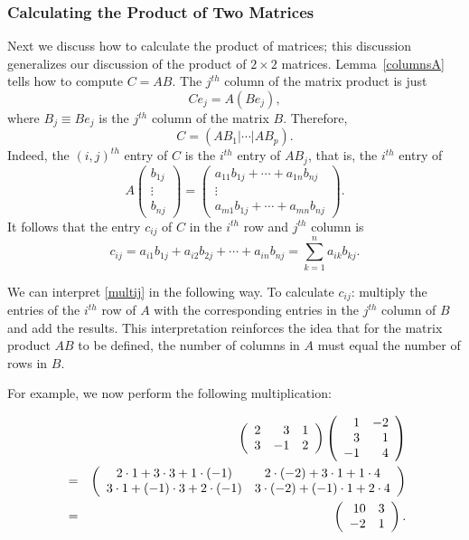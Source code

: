 \documentclass{ximera}
\begin{document}
\subsubsection*{Calculating the Product of Two Matrices}

Next we discuss how to calculate the product of matrices; this
discussion generalizes our discussion of the product of $2\times 2$
matrices.  Lemma~\ref{columnsA} tells how to compute $C=AB$.  The $j^{th}$
column of the matrix product is just
\[
Ce_j = A(Be_j),
\]
where $B_j\equiv Be_j$ is the $j^{th}$ column of the matrix $B$.  Therefore,
\begin{equation}  \label{E:matprod}
C = (AB_1|\cdots|AB_p).
\end{equation}
Indeed, the $(i,j)^{th}$ entry of $C$ is the $i^{th}$ entry of $AB_j$,
that is, the $i^{th}$ entry of
\[
A\left(\begin{array}{c} b_{1j}\\ \vdots\\
b_{nj}\end{array}\right)
=
\left(\begin{array}{c} a_{11}b_{1j} + \cdots + a_{1n}b_{nj} \\
\vdots \\ a_{m1}b_{1j} + \cdots + a_{mn}b_{nj}
\end{array}\right).
\]
It follows that the entry $c_{ij}$ of $C$ in the $i^{th}$ row and
$j^{th}$ column is
\begin{equation} \label{multij}
c_{ij} = a_{i1}b_{1j} + a_{i2}b_{2j} + \cdots + a_{in}b_{nj} =
\sum_{k=1}^n a_{ik}b_{kj}.
\end{equation}

We can interpret \eqref{multij} in the following way.  To calculate $c_{ij}$:
multiply the entries of the $i^{th}$ row of $A$ with the corresponding
entries in the $j^{th}$ column of $B$ and add the results.  This
interpretation reinforces the
idea that for the matrix product $AB$ to be defined, the number of columns
in $A$ must equal the number of rows in $B$.

For example, we now perform the following multiplication:

\begin{eqnarray*}
& & \left(\begin{array}{rrr} 2 & 3 & 1 \\ 3 & -1 & 2 \end{array}\right)
\left(\begin{array}{rr} 1 & -2 \\ 3 & 1 \\ -1 & 4 \end{array}\right)\\
& = & \left(\begin{array}{cc} 2\cdot 1+3\cdot 3 + 1\cdot(-1) & 2\cdot(-2)+3\cdot 1+1\cdot 4\\ 3\cdot 1 + (-1)\cdot 3+2\cdot(-1) &3\cdot(-2)+(-1)\cdot 1+2\cdot 4\end{array}\right)\\
& = & \left(\begin{array}{rr} 10 & 3\\ -2 &1\end{array}\right).
\end{eqnarray*}
\end{document}
